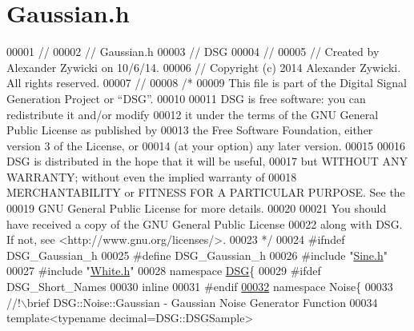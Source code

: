 \hypertarget{_gaussian_8h_source}{\section{Gaussian.\+h}
\label{_gaussian_8h_source}
}

\begin{DoxyCode}
00001 \textcolor{comment}{//}
00002 \textcolor{comment}{//  Gaussian.h}
00003 \textcolor{comment}{//  DSG}
00004 \textcolor{comment}{//}
00005 \textcolor{comment}{//  Created by Alexander Zywicki on 10/6/14.}
00006 \textcolor{comment}{//  Copyright (c) 2014 Alexander Zywicki. All rights reserved.}
00007 \textcolor{comment}{//}
00008 \textcolor{comment}{/*}
00009 \textcolor{comment}{ This file is part of the Digital Signal Generation Project or “DSG”.}
00010 \textcolor{comment}{}
00011 \textcolor{comment}{ DSG is free software: you can redistribute it and/or modify}
00012 \textcolor{comment}{ it under the terms of the GNU General Public License as published by}
00013 \textcolor{comment}{ the Free Software Foundation, either version 3 of the License, or}
00014 \textcolor{comment}{ (at your option) any later version.}
00015 \textcolor{comment}{}
00016 \textcolor{comment}{ DSG is distributed in the hope that it will be useful,}
00017 \textcolor{comment}{ but WITHOUT ANY WARRANTY; without even the implied warranty of}
00018 \textcolor{comment}{ MERCHANTABILITY or FITNESS FOR A PARTICULAR PURPOSE.  See the}
00019 \textcolor{comment}{ GNU General Public License for more details.}
00020 \textcolor{comment}{}
00021 \textcolor{comment}{ You should have received a copy of the GNU General Public License}
00022 \textcolor{comment}{ along with DSG.  If not, see <http://www.gnu.org/licenses/>.}
00023 \textcolor{comment}{ */}
00024 \textcolor{preprocessor}{#ifndef DSG\_Gaussian\_h}
00025 \textcolor{preprocessor}{#define DSG\_Gaussian\_h}
00026 \textcolor{preprocessor}{#include "\hyperlink{_sine_8h}{Sine.h}"}
00027 \textcolor{preprocessor}{#include "\hyperlink{_white_8h}{White.h}"}
00028 \textcolor{keyword}{namespace }\hyperlink{namespace_d_s_g}{DSG}\{
00029 \textcolor{preprocessor}{#ifdef DSG\_Short\_Names}
00030     \textcolor{keyword}{inline}
00031 \textcolor{preprocessor}{#endif}
\hypertarget{_gaussian_8h_source_l00032}{}\hyperlink{namespace_d_s_g_1_1_noise}{00032}     \textcolor{keyword}{namespace }Noise\{\textcolor{comment}{}
00033 \textcolor{comment}{        //!\(\backslash\)brief DSG::Noise::Gaussian - Gaussian Noise Generator Function}
00034 \textcolor{comment}{}        \textcolor{keyword}{template}<\textcolor{keyword}{typename} decimal=DSG::DSGSample>

\end{DoxyCode}
